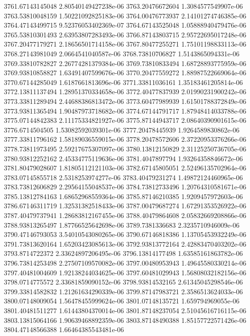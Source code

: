{3761.67143145048 2.80540149427238e-06
3763.20476672604 1.3084577549907e-06
3763.53810048159 1.50221092825183e-06
3764.00476773937 2.14101274746385e-06
3764.47143499715 9.52376053402369e-07
3764.67143525048 1.05888940479476e-06
3765.53810301493 2.63953807283493e-06
3766.87143803715 2.95722695017248e-06
3767.20477179271 2.18656501714158e-06
3767.80477255271 1.75101198833113e-06
3768.27143981049 2.0664541040587e-06
3768.73810706827 1.5143865094331e-06
3769.33810782827 2.26774281379384e-06
3769.73810833494 1.68728893775959e-06
3769.93810858827 1.63491407599676e-06
3770.20477559272 1.88987522669064e-06
3770.67144285049 1.6187661813696e-06
3771.33811036161 1.35183461205814e-06
3772.13811137494 1.28951370334658e-06
3772.40477837939 2.01990231900242e-06
3773.33811289494 2.44688386813472e-06
3773.60477989939 1.61501788372849e-06
3773.93811365494 1.90487973718682e-06
3774.67144791717 1.87948414033788e-06
3775.07144842383 2.11175334821927e-06
3775.87144943717 2.08640390901615e-06
3776.6714504505 1.53082592039301e-06
3777.20478445939 1.9264589830862e-06
3777.33811796162 1.58189036559015e-06
3778.20478572606 2.37220953376266e-06
3778.73811973495 2.59217675307097e-06
3780.13812150829 2.31125250736705e-06
3780.93812252162 2.45334775119636e-06
3781.4047897794 1.93264358846672e-06
3781.80479028607 1.81805112121103e-06
3782.67145805051 2.52496135702964e-06
3783.07145855718 2.5318253974277e-06
3783.40479231274 1.49872124460965e-06
3783.73812606829 2.29564155048537e-06
3784.73812733496 1.20764310581671e-06
3785.13812784163 1.68652968559364e-06
3785.87146210385 1.9209457972603e-06
3786.67146311719 1.32531382518433e-06
3787.00479687274 1.67291353526922e-06
3787.40479737941 1.28683812167455e-06
3788.40479864608 2.05832669208866e-06
3788.93813265497 1.87766525642698e-06
3789.7381336683 2.3235710946009e-06
3790.47146793053 3.54010543080265e-06
3790.67146818386 1.13705453932249e-06
3791.73813620164 1.65203423085613e-06
3792.93813772164 2.42883470403202e-06
3793.8714722372 2.33624897206495e-06
3796.13814177498 1.63585161863782e-06
3796.73814253498 2.27507109570082e-06
3797.00480953943 1.49645580330214e-06
3797.40481004609 1.92138244034625e-06
3797.60481029943 1.56808032182156e-06
3798.0714775572 2.33681859090152e-06
3798.93814532165 2.61345045298546e-06
3799.33814582832 1.21261634290339e-06
3799.87147983721 2.3586513624033e-06
3800.07148009054 1.56478455999624e-06
3801.07148135721 1.659794969055e-06
3801.40481511277 1.61443804370014e-06
3801.87148237054 2.51045616716115e-06
3803.13815064166 1.90639468892359e-06
3803.87148490388 1.85157722571426e-06
3804.47148566388 1.66464385543481e-06
}
